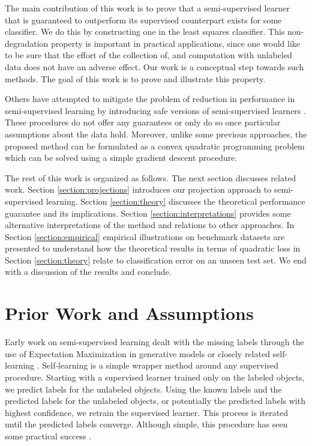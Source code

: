 \documentclass[twoside]{memoir}\usepackage[]{graphicx}\usepackage{xcolor}
\begin{document}
The main contribution of this work is to prove that a semi-supervised learner that is guaranteed to outperform its supervised counterpart exists for some classifier. We do this by constructing one in the least squares classifier. This non-degradation property is important in practical applications, since one would like to be sure that the effort of the collection of, and computation with unlabeled data does not have an adverse effect. Our work is a conceptual step towards such methods. The goal of this work is to prove and illustrate this property.

Others have attempted to mitigate the problem of reduction in performance in semi-supervised learning by introducing safe versions of semi-supervised learners \citep{Li2011,Loog2010,Loog2014a}. These procedures do not offer any guarantees or only do so once particular assumptions about the data hold. Moreover, unlike some previous approaches, the proposed method can be formulated as a convex quadratic programming problem which can be solved using a simple gradient descent procedure.

The rest of this work is organized as follows. The next section discusses related work. Section \ref{section:projections} introduces our projection approach to semi-supervised learning. Section \ref{section:theory} discusses the theoretical performance guarantee and its implications. Section \ref{section:interpretations} provides some alternative interpretations of the method and relations to other approaches. In Section \ref{section:empirical} empirical illustrations on benchmark datasets are presented to understand how the theoretical results in terms of quadratic loss in Section \ref{section:theory} relate to classification error on an unseen test set. We end with a discussion of the results and conclude.

\section{Prior Work and Assumptions}

Early work on semi-supervised learning dealt with the missing labels through the use of Expectation Maximization in generative models or closely related self-learning \citep{McLachlan1975}. Self-learning is a simple wrapper method around any supervised procedure. Starting with a supervised learner trained only on the labeled objects, we predict labels for the unlabeled objects. Using the known labels and the predicted labels for the unlabeled objects, or potentially the predicted labels with highest confidence, we retrain the supervised learner. This process is iterated until the predicted labels converge. Although simple, this procedure has seen some practical success \citep{Nigam2000}.
\end{document}
